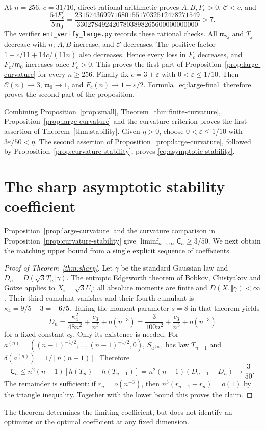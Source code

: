 \documentclass[11pt,a4paper]{article}
\theoremstyle{remark}\newtheorem{remark}[theorem]{Remark}
\begin{document}
At $n=256$, $c=31/10$, direct rational arithmetic proves $A,B,F_c>0$,
$\mathcal C<c$, and
\[
 \frac{54F_c}{5\mathfrak m_0}
 =\frac{23157436997168015517032512478271549}
        {3302784924207803898265600000000000}>7.
\]
The verifier \texttt{ent\_verify\_large.py} records these rational checks.
All $\mathfrak m_{2j}$ and $T_j$ decrease with $n$; $A,B$ increase,
and $\mathcal C$ decreases. The positive factor
$1-c/11+14c/(11n)$ also decreases. Hence every loss in $F_c$ decreases,
and $F_c/\mathfrak m_0$ increases once $F_c>0$. This proves the first
part of Proposition~\ref{prop:large-curvature} for every $n\ge256$.
Finally fix $c=3+\varepsilon$ with $0<\varepsilon\le1/10$.
Then $\mathcal C(n)\to3$, $\mathfrak m_0\to1$, and
$F_c(n)\to1-\varepsilon/2$. Formula~\eqref{eq:large-final} therefore
proves the second part of the proposition.

Combining Proposition~\ref{prop:small}, Theorem~\ref{thm:finite-curvature},
Proposition~\ref{prop:large-curvature} and the curvature criterion proves
the first assertion of Theorem~\ref{thm:stability}. Given $\eta>0$, choose
$0<\varepsilon\le1/10$ with $3\varepsilon/50<\eta$. The second assertion
of Proposition~\ref{prop:large-curvature}, followed by
Proposition~\ref{prop:curvature-stability}, proves
\eqref{eq:asymptotic-stability}.

\section{The sharp asymptotic stability coefficient}\label{sec:sharp}
Proposition~\ref{prop:large-curvature} and the curvature comparison in
Proposition~\ref{prop:curvature-stability} give
$\liminf_{n\to\infty}\mathsf C_n\ge3/50$.
We next obtain the matching upper bound from a single explicit sequence
of coefficients.

\begin{proof}[Proof of Theorem~\ref{thm:sharp}]
Let $\gamma$ be the standard Gaussian law and
$D_n=D(\sqrt3T_n\Vert\gamma)$. The entropic Edgeworth theorem of
Bobkov, Chistyakov and G\"otze \cite[Theorem~1.1]{BCG} applies to
$X_i=\sqrt3U_i$: all absolute moments are finite and
$D(X_1\Vert\gamma)<\infty$. Their third cumulant vanishes and their
fourth cumulant is $\kappa_4=9/5-3=-6/5$.
Taking the moment parameter $s=8$ in that theorem yields
\[
 D_n=\frac{\kappa_4^2}{48n^2}+\frac{c_3}{n^3}+o(n^{-3})
     =\frac{3}{100n^2}+\frac{c_3}{n^3}+o(n^{-3})
\]
for a fixed constant $c_3$. Only its existence is needed.
For $a^{(n)}=((n-1)^{-1/2},\ldots,(n-1)^{-1/2},0)$,
$S_{a^{(n)}}$ has law $T_{n-1}$ and
$\delta(a^{(n)})=1/[n(n-1)]$. Therefore
\[
 \mathsf C_n\le n^2(n-1)[h(T_n)-h(T_{n-1})]
               =n^2(n-1)(D_{n-1}-D_n)\longrightarrow\frac3{50}.
\]
The remainder is sufficient: if $r_n=o(n^{-3})$, then
$n^3(r_{n-1}-r_n)=o(1)$ by the triangle inequality. Together with the
lower bound this proves the claim.
\end{proof}
The theorem determines the limiting coefficient, but does not identify
an optimizer or the optimal coefficient at any fixed dimension.
\end{document}
